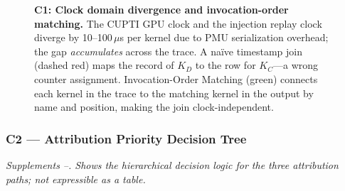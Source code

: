 \begin{figure}[H]
\caption{\textbf{C1: Clock domain divergence and invocation-order matching.}
  The \nsys CUPTI GPU clock and the \ncu injection replay clock diverge by
  10--100\,$\mu$s per kernel due to PMU serialization overhead; the gap
  \emph{accumulates} across the trace.  A naïve timestamp join (dashed red)
  maps the \nsys record of $K_D$ to the \ncu row for $K_C$---a wrong counter
  assignment.  Invocation-Order Matching (green) connects each kernel in the
  \nsys trace to the matching kernel in the \ncu output by name and position,
  making the join clock-independent.}
\label{fig:cand:clockdomain}
\end{figure}


\subsubsection*{C2 --- Attribution Priority Decision Tree}
\noindent\textit{Supplements --.
  Shows the hierarchical decision logic for the three attribution paths; not
  expressible as a table.}

